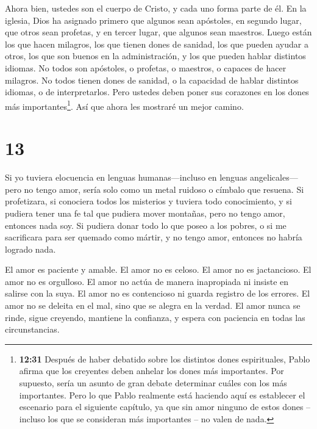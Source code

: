  Ahora bien, ustedes son el cuerpo de Cristo, y cada uno
forma parte de él.  En la iglesia, Dios ha asignado primero
que algunos sean apóstoles, en segundo lugar, que otros sean profetas, y
en tercer lugar, que algunos sean maestros. Luego están los que hacen
milagros, los que tienen dones de sanidad, los que pueden ayudar a
otros, los que son buenos en la administración, y los que pueden hablar
distintos idiomas.  No todos son apóstoles, o profetas, o
maestros, o capaces de hacer milagros.  No todos tienen
dones de sanidad, o la capacidad de hablar distintos idiomas, o de
interpretarlos.  Pero ustedes deben poner sus corazones en
los dones más importantes\footnote{\textbf{12:31} Después de haber
  debatido sobre los distintos dones espirituales, Pablo afirma que los
  creyentes deben anhelar los dones más importantes. Por supuesto, sería
  un asunto de gran debate determinar cuáles con los más importantes.
  Pero lo que Pablo realmente está haciendo aquí es establecer el
  escenario para el siguiente capítulo, ya que sin amor ninguno de estos
  dones -- incluso los que se consideran más importantes -- no valen de
  nada.}. Así que ahora les mostraré un mejor camino.

\hypertarget{section-12}{%
\section{13}\label{section-12}}

 Si yo tuviera elocuencia en lenguas humanas---incluso en
lenguas angelicales---pero no tengo amor, sería solo como un metal
ruidoso o címbalo que resuena.  Si profetizara, si conociera
todos los misterios y tuviera todo conocimiento, y si pudiera tener una
fe tal que pudiera mover montañas, pero no tengo amor, entonces nada
soy.  Si pudiera donar todo lo que poseo a los pobres, o si
me sacrificara para ser quemado como mártir, y no tengo amor, entonces
no habría logrado nada.

 El amor es paciente y amable. El amor no es celoso. El amor
no es jactancioso. El amor no es orgulloso.  El amor no
actúa de manera inapropiada ni insiste en salirse con la suya. El amor
no es contencioso ni guarda registro de los errores.  El
amor no se deleita en el mal, sino que se alegra en la verdad.
 El amor nunca se rinde, sigue creyendo, mantiene la
confianza, y espera con paciencia en todas las circunstancias.

